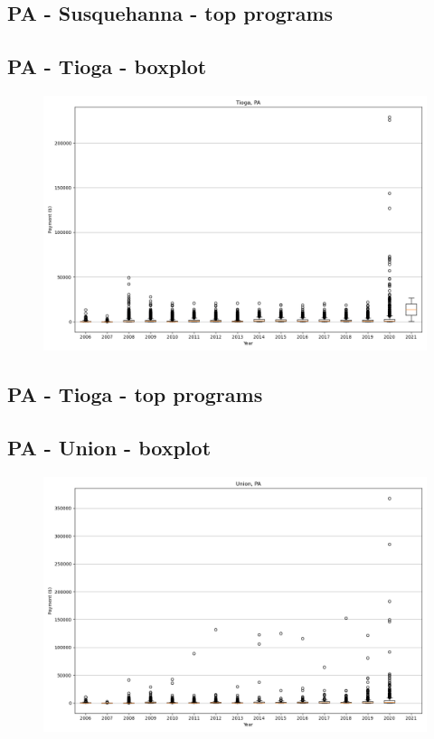 \subsection*{PA - Susquehanna - top programs}

\newpage
\subsection*{PA - Tioga - boxplot}
\begin{figure}[h]
\centering
\includegraphics[width=7in]{../output/boxplots/counties/Tioga-PA_boxplot.png}
\end{figure}


\subsection*{PA - Tioga - top programs}

\newpage
\subsection*{PA - Union - boxplot}
\begin{figure}[h]
\centering
\includegraphics[width=7in]{../output/boxplots/counties/Union-PA_boxplot.png}
\end{figure}


